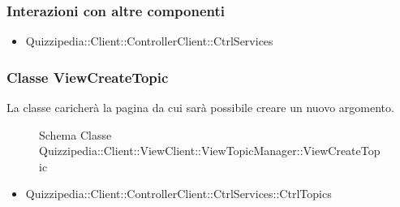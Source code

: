 \subsubsection{Interazioni con altre componenti}
\begin{itemize}
\item Quizzipedia::Client::ControllerClient::CtrlServices
\end{itemize}
\subsubsection{Classe ViewCreateTopic}
La classe caricherà la pagina da cui sarà possibile creare un nuovo argomento.
\begin{figure}[H]
\centering
\noindent{}
\caption[Schema Classe ViewCreateTopic]{Schema Classe Quizzipedia::Client::ViewClient::ViewTopicManager::ViewCreateTopic}
\end{figure}
\begin{itemize}
\item Quizzipedia::Client::ControllerClient::CtrlServices::CtrlTopics
\end{itemize}
